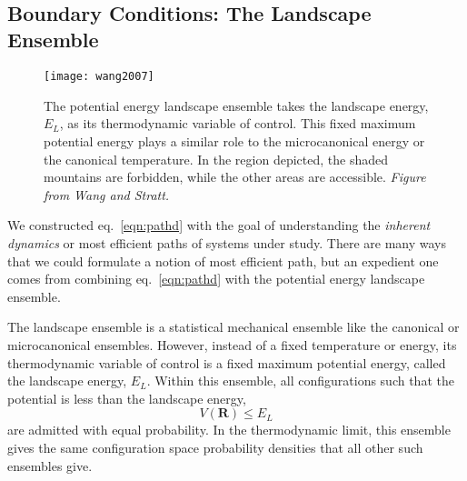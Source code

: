 \documentclass[letterpaper]{tufte-handout}
\renewcommand{\refeq}[1]{eq.~\ref{eqn:#1}}
\renewcommand{\vec}[1]{\mathbf{#1}}
\newcommand{\cvec}[1]{\vec{#1}}
\renewcommand{\refeq}[1]{eq.~\ref{eqn:#1}}
\begin{document}
\FloatBarrier\
\subsection{Boundary Conditions: The Landscape Ensemble}
\begin{figure}
  \texttt{[image: wang2007]}
  \caption{\label{fig:pele} The potential energy landscape ensemble takes the landscape energy, $E_L$, as its thermodynamic variable of control. This fixed maximum potential energy plays a similar role to the microcanonical energy or the canonical temperature. In the region depicted, the shaded mountains are forbidden, while the other areas are accessible. \emph{Figure from Wang and Stratt.}}
\end{figure}
We constructed \refeq{pathd} with the goal of understanding the \emph{inherent dynamics} or most efficient paths of systems under study. There are many ways that we could formulate a notion of most efficient path, but an expedient one comes from combining  \refeq{pathd} with the potential energy landscape ensemble\cite{wang:2007:pele}.

The landscape ensemble is a statistical mechanical ensemble like the canonical or microcanonical ensembles. However, instead of a fixed temperature or energy, its thermodynamic variable of control is a fixed maximum potential energy, called the landscape energy, $E_L$. Within this ensemble, all configurations such that the potential is less than the landscape energy,
\[
  V(\cvec{R}) \le E_L
\]
are admitted with equal probability. In the thermodynamic limit, this ensemble gives the same configuration space probability densities that all other such ensembles give.
\end{document}
